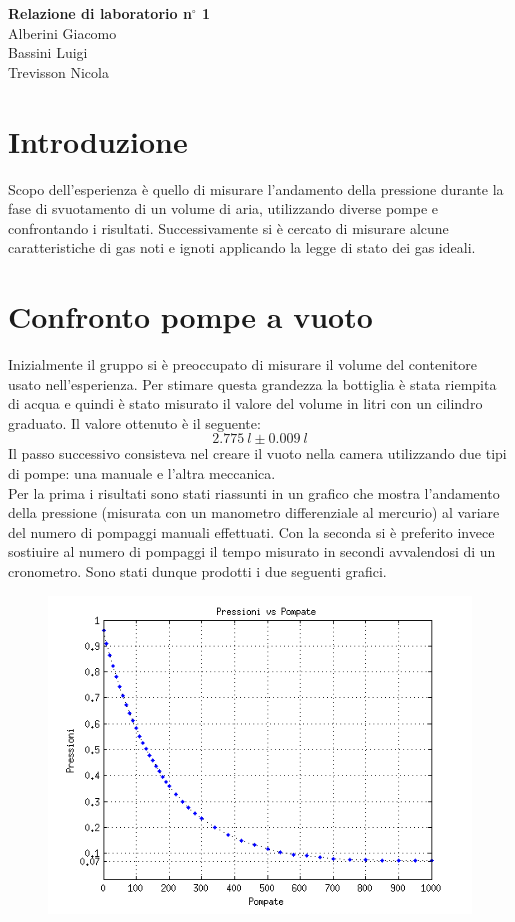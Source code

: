 \documentclass[a4paper,11pt]{article}
\begin{document}
\begin{center}
\textbf{\huge Relazione di laboratorio n\ensuremath{^\circ} 1} \\ \vspace{10pt}
\large Alberini Giacomo \\ Bassini Luigi \\ Trevisson Nicola 
\end{center}

\section{Introduzione}
Scopo dell'esperienza è quello di misurare l'andamento della pressione durante la fase di svuotamento di un volume di aria, utilizzando diverse pompe e confrontando i risultati. Successivamente si è cercato di misurare alcune caratteristiche di gas noti e ignoti applicando la legge di stato dei gas ideali. 
\section{Confronto pompe a vuoto}

Inizialmente il gruppo si è preoccupato di misurare il volume del contenitore usato nell'esperienza. Per stimare questa grandezza la bottiglia è stata riempita di acqua e quindi è stato misurato il valore del volume in litri con un cilindro graduato. Il valore ottenuto è il seguente:
$$2.775  ~l\pm 0.009 ~l$$
Il passo successivo consisteva nel creare il vuoto nella camera utilizzando due tipi di pompe: una manuale e l'altra meccanica. \\
Per la prima i risultati sono stati riassunti in un grafico che mostra l'andamento della pressione (misurata con un manometro differenziale al mercurio) al variare del numero di pompaggi manuali effettuati. Con la seconda si è preferito invece sostiuire al numero di pompaggi il tempo misurato in secondi avvalendosi di un cronometro. Sono stati dunque prodotti i due seguenti grafici.
\\

\begin{figure}[htbp]
\centering
\includegraphics[width=15cm]{prexpomp.png}
\end{figure}
\end{document}

